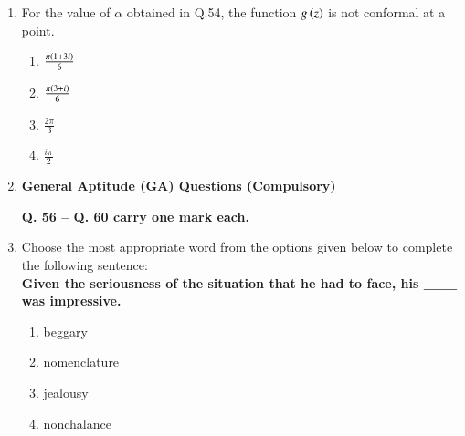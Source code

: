 \documentclass[journal]{IEEEtran}
\begin{document}
\begin{enumerate}
{            \begin{multicols}{4}
                \begin{enumerate}
                    \item -1
                    \item 1
                    \item 2
                    \item 3
                \end{enumerate}
            \end{multicols}
        }
	\item{
        	
        	For the value of $\alpha$ obtained in Q.54, the function $g\left(z\right)$ is not conformal at a point.
        	\hfill
        	
        	\begin{multicols}{4}
        		\begin{enumerate}
        			\item $\frac{\pi\left(1+3i\right)}{6}$
        			\item $\frac{\pi\left(3+i\right)}{6}$  
        			\item $\frac{2\pi}{3}$
        			\item $\frac{i\pi}{2}$
        		\end{enumerate}
        	\end{multicols}
      }
\item[]{
\textbf{General Aptitude (GA) Questions (Compulsory)}

\textbf{Q. 56 – Q. 60 carry one mark each.}\\}
        \item {Choose the most appropriate word from the options given below to complete the following
    sentence: \\ \textbf{
    Given the seriousness of the situation that he had to face, his \_\_\_ was impressive.} \\ 
    \begin{multicols}{4}
    	\begin{enumerate}
    		\item beggary 
    		\item nomenclature
    		\item jealousy
    		\item nonchalance
    	\end{enumerate}
    \end{multicols}}
    

\end{enumerate}
\end{document}
